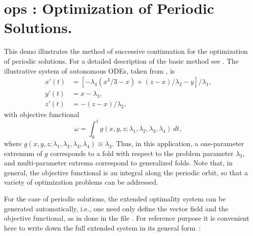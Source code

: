 \documentclass[12pt]{report}
\begin{document}
\section{ ops : Optimization of Periodic Solutions.} \label{sec:Demos_ops}
This demo illustrates the method of successive continuation
for the optimization of periodic solutions.
For a detailed description of the basic method see
 \citeyear{DoKeKe:91b}.
The illustrative system of autonomous ODEs, taken from 
 \citeyear{Alej:91}, is
\begin{equation} \begin{array}{cl}
  x'(t) & = [-\lambda_4(x^3/3-x) + (z-x)/\lambda_2 - y]/\lambda_1, \\
  y'(t) &= x-\lambda_3, \\
  z'(t) &= -(z-x)/\lambda_2,
\end{array} \end{equation}
with objective functional
$$ \omega = 
  \int_0^{1} g(x,y,z;\lambda_1,\lambda_2,\lambda_3,\lambda_4) ~ dt, $$
where $g(x,y,z;\lambda_1,\lambda_2,\lambda_3,\lambda_4) \equiv \lambda_3$.
Thus, in this application, a one-parameter extremum of $g$ corresponds
to a fold with respect to the problem parameter $\lambda_3$, 
and multi-parameter extrema correspond to generalized folds.
Note that, in general, the objective functional is an integral along 
the periodic orbit, so that a variety of optimization problems
can be addressed.

For the case of periodic solutions, the extended optimality system
can be generated automatically, i.e., one need only define the vector field 
and the objective functional, as in done in the file .
For reference purpose it is convenient here to write down
the full extended system in its general form~:
\end{document}
